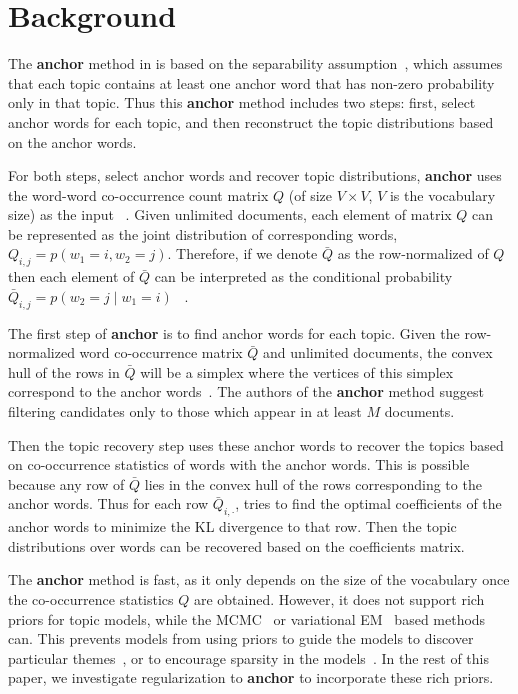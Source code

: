 \documentclass{article}
\begin{document}
\section{Background}
\label{sec:background}

The {\bf anchor} method in \cite{Arora-2012} is based on the separability
assumption~\cite{Donoho-2003}, which assumes that each topic contains at least
one anchor word that has non-zero probability only in that topic.  Thus this
{\bf anchor} method includes two steps: first, select anchor words for each
topic, and then reconstruct the topic distributions based on the anchor words.

For both steps, select anchor words and recover topic distributions, 
{\bf anchor} uses the word-word co-occurrence count matrix $Q$ (of size $V \times V$, 
$V$ is the vocabulary size) as the input ~\cite{Arora-2012b}. 
Given unlimited documents, each element of matrix $Q$ can be represented 
as the joint distribution of corresponding words, $Q_{i,j} = p(w_1 =i, w_2=j)$. 
Therefore, if we denote $\bar{Q}$ as the row-normalized of $Q$ then each element 
of $\bar{Q}$ can be interpreted as the conditional probability 
$\bar{Q}_{i,j} = p(w_2=j \mid w_1=i)$ ~\cite{Arora-2012}.

The first step of {\bf anchor} is to find anchor words for each topic.  Given
the row-normalized word co-occurrence matrix $\bar{Q}$ and unlimited documents,
the convex hull of the rows in $\bar{Q}$ will be a simplex where the vertices of
this simplex correspond to the anchor words~\cite{Arora-2012}.  The authors of
the {\bf anchor} method suggest filtering candidates only to those which appear
in at least $M$ documents.

Then the topic recovery step uses these anchor words to recover the topics based
on co-occurrence statistics of words with the anchor words.  This is possible
because any row of $\bar{Q}$ lies in the convex hull of the rows corresponding to 
the anchor words. Thus for each row $\bar{Q}_{i,\cdot}$,
\cite{Arora-2012} tries to find the optimal coefficients of the anchor words to
minimize the KL divergence to that row.  Then the topic distributions over words
can be recovered based on the coefficients matrix.

The {\bf anchor} method is fast, as it only depends on the size of the
vocabulary once the co-occurrence statistics $Q$ are obtained.  However, it
does not support rich priors for topic models, while the
MCMC~\cite{griffiths-04} or variational EM~\cite{blei-03} based methods can.
This prevents models from using priors to guide the models to discover
particular themes~\cite{zhai-12}, or to encourage sparsity in the models~\cite{yao-09}.  
In the rest of this paper, we investigate regularization to {\bf anchor} 
to incorporate these rich priors.
\end{document}

